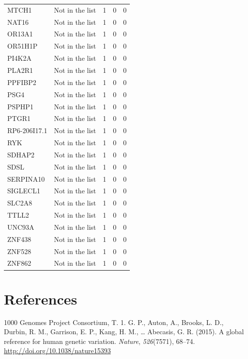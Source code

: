 \documentclass[12pt,twoside]{reedthesis}
\theoremstyle{definition}
\theoremstyle{definition}
\theoremstyle{remark}
\begin{document}
\begin{longtable}[t]{llrrr}
  MTCH1 & Not in the list & 1 & 0 & 0\\
  NAT16 & Not in the list & 1 & 0 & 0\\
  \addlinespace
  OR13A1 & Not in the list & 1 & 0 & 0\\
  OR51H1P & Not in the list & 1 & 0 & 0\\
  PI4K2A & Not in the list & 1 & 0 & 0\\
  PLA2R1 & Not in the list & 1 & 0 & 0\\
  PPFIBP2 & Not in the list & 1 & 0 & 0\\
  \addlinespace
  PSG4 & Not in the list & 1 & 0 & 0\\
  PSPHP1 & Not in the list & 1 & 0 & 0\\
  PTGR1 & Not in the list & 1 & 0 & 0\\
  RP6-206I17.1 & Not in the list & 1 & 0 & 0\\
  RYK & Not in the list & 1 & 0 & 0\\
  \addlinespace
  SDHAP2 & Not in the list & 1 & 0 & 0\\
  SDSL & Not in the list & 1 & 0 & 0\\
  SERPINA10 & Not in the list & 1 & 0 & 0\\
  SIGLECL1 & Not in the list & 1 & 0 & 0\\
  SLC2A8 & Not in the list & 1 & 0 & 0\\
  \addlinespace
  TTLL2 & Not in the list & 1 & 0 & 0\\
  UNC93A & Not in the list & 1 & 0 & 0\\
  ZNF438 & Not in the list & 1 & 0 & 0\\
  ZNF528 & Not in the list & 1 & 0 & 0\\
  ZNF862 & Not in the list & 1 & 0 & 0\\
  \bottomrule
  \end{longtable}
  
  \backmatter
  
  \chapter*{References}\label{references}
  
  \noindent
  
  \setlength{\parindent}{-0.20in} \setlength{\leftskip}{0.20in}
  \setlength{\parskip}{8pt}
  
  \hypertarget{refs}{}
  \hypertarget{ref-1000GenomesProjectConsortium2015}{}
  1000 Genomes Project Consortium, T. 1. G. P., Auton, A., Brooks, L. D.,
  Durbin, R. M., Garrison, E. P., Kang, H. M., \ldots{} Abecasis, G. R.
  (2015). A global reference for human genetic variation. \emph{Nature},
  \emph{526}(7571), 68--74. \url{http://doi.org/10.1038/nature15393}
  
\end{document}
